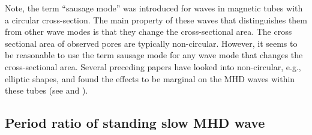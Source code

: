   	Note, the term ``sausage mode'' was introduced for waves in magnetic tubes with a circular cross-section.
  	The main property of these waves that distinguishes them from other wave modes is that they change the cross-sectional area.
  	The cross sectional area of observed pores are typically non-circular.
  	However, it seems to be reasonable to use the term sausage mode for any wave mode that changes the cross-sectional area.
  	Several preceding papers have looked into non-circular, e.g., elliptic shapes, and found the effects to be marginal on the MHD waves within these tubes (see \citealt{2009A&A...494..295E} and \citealt{2011A&A...527A..53M}).
  	  
    \subsection{Period ratio of standing slow MHD wave}
    \label{stand}
    
